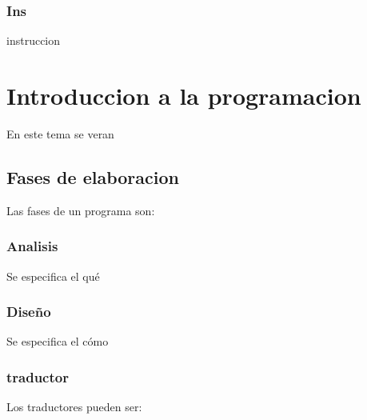 	\subsection{Ins}
	instruccion

\chapter{Introduccion a la programacion}
En este tema se veran
	\section{Fases de elaboracion}
	Las fases de un programa son:
		\subsection{Analisis}
		Se especifica el qué
		\subsection{Diseño}
		Se especifica el cómo
		\subsection{traductor}
		Los traductores pueden ser: 

